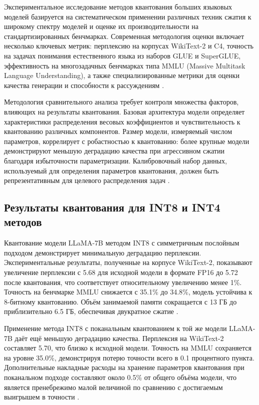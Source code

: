\documentclass[bachelor, och, coursework]{SCWorks}
\begin{document}
	Экспериментальное исследование методов квантования больших языковых моделей базируется на систематическом применении различных техник сжатия к широкому спектру моделей и оценке их производительности на стандартизированных бенчмарках. Современная методология оценки включает несколько ключевых метрик: перплексию на корпусах WikiText-2 и C4, точность на задачах понимания естественного языка из наборов GLUE и SuperGLUE, эффективность на многозадачных бенчмарках типа MMLU (Massive Multitask Language Understanding), а также специализированные метрики для оценки качества генерации и способности к рассуждениям \cite{survey}.
	
	Методология сравнительного анализа требует контроля множества факторов, влияющих на результаты квантования. Базовая архитектура модели определяет характеристики распределения весовых коэффициентов и чувствительность к квантованию различных компонентов. Размер модели, измеряемый числом параметров, коррелирует с робастностью к квантованию: более крупные модели демонстрируют меньшую деградацию качества при агрессивном сжатии благодаря избыточности параметризации. Калибровочный набор данных, используемый для определения параметров квантования, должен быть репрезентативным для целевого распределения задач \cite{longcontext}.
	
	\subsection{Результаты квантования для INT8 и INT4 методов}
	
	Квантование модели LLaMA-7B методом INT8 с симметричным послойным подходом демонстрирует минимальную деградацию перплексии. Экспериментальные результаты, полученные на корпусе WikiText-2, показывают увеличение перплексии с 5.68 для исходной модели в формате FP16 до 5.72 после квантования, что соответствует относительному увеличению менее 1\%. Точность на бенчмарке MMLU снижается с 35.1\% до 34.8\%, модель устойчива к 8-битному квантованию. Объём занимаемой памяти сокращается с 13 ГБ до приблизительно 6.5 ГБ, обеспечивая двукратное сжатие \cite{llmint8}.
	
	Применение метода INT8 с поканальным квантованием к той же модели LLaMA-7B даёт ещё меньшую деградацию качества. Перплексия на WikiText-2 составляет 5.70, что близко к исходной модели. Точность на MMLU сохраняется на уровне 35.0\%, демонстрируя потерю точности всего в 0.1 процентного пункта. Дополнительные накладные расходы на хранение параметров квантования при поканальном подходе составляют около 0.5\% от общего объёма модели, что является пренебрежимо малой величиной по сравнению с достигаемым выигрышем в точности \cite{smoothquant}.
	
\end{document}
